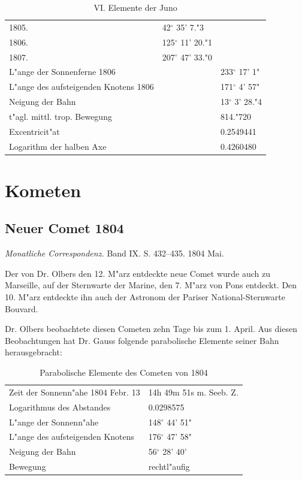 \documentclass[12pt,a4paper]{article}
\begin{document}
\begin{table}[H]
\centering
\begin{tabular}{l l l}
\toprule
1805. & 42$^\circ$ 35' 7."3 & \\
1806. & 125$^\circ$ 11' 20."1 & \\
1807. & 207$^\circ$ 47' 33."0 & \\
\midrule
L"ange der Sonnenferne 1806 & \dotfill & 233$^\circ$ 17' 1" \\
L"ange des aufsteigenden Knotens 1806 & \dotfill & 171$^\circ$ 4' 57" \\
Neigung der Bahn & \dotfill & 13$^\circ$ 3' 28."4 \\
t"agl. mittl. trop. Bewegung & \dotfill & 814."720 \\
Excentricit"at & \dotfill & 0.2549441 \\
Logarithm der halben Axe & \dotfill & 0.4260480 \\
\bottomrule
\end{tabular}
\caption{VI. Elemente der Juno}
\end{table}

\section{Kometen}

\subsection{Neuer Comet 1804}

\textit{Monatliche Correspondenz.} Band IX. S. 432--435. 1804 Mai.

Der von Dr. Olbers den 12. M"arz entdeckte neue Comet wurde auch zu Marseille, auf der Sternwarte der Marine, den 7. M"arz von Pons entdeckt. Den 10. M"arz entdeckte ihn auch der Astronom der Pariser National-Sternwarte Bouvard.

Dr. Olbers beobachtete diesen Cometen zehn Tage bis zum 1. April. Aus diesen Beobachtungen hat Dr. Gauss folgende parabolische Elemente seiner Bahn herausgebracht:

\begin{table}[H]
\centering
\begin{tabular}{l l}
\toprule
Zeit der Sonnenn"ahe 1804 Febr. 13 & 14h 49m 51s m. Seeb. Z. \\
Logarithmus des Abstandes & 0.0298575 \\
L"ange der Sonnenn"ahe & 148$^\circ$ 44' 51" \\
L"ange des aufsteigenden Knotens & 176$^\circ$ 47' 58" \\
Neigung der Bahn & 56$^\circ$ 28' 40' \\
Bewegung & rechtl"aufig \\
\bottomrule
\end{tabular}
\caption{Parabolische Elemente des Cometen von 1804}
\end{table}
\end{document}
